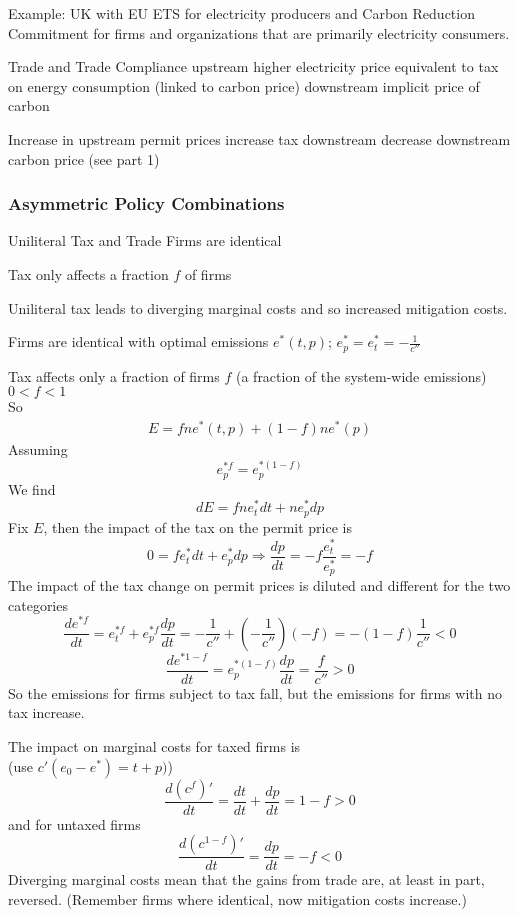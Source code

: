 	Example: UK with EU ETS for electricity producers and Carbon Reduction Commitment for firms and organizations that are primarily electricity consumers.


Trade and Trade
Compliance upstream
	higher electricity price
	equivalent to tax on energy consumption (linked to carbon price)
	downstream implicit price of carbon


Increase in upstream permit prices
	increase tax downstream
	decrease downstream carbon price (see part 1)


\subsubsection{Asymmetric Policy Combinations}

Uniliteral Tax and Trade
	Firms are identical
	
	Tax only affects a fraction $f$ of firms
	
	Uniliteral tax leads to diverging marginal costs and so increased mitigation costs.
	
	Firms are identical with optimal emissions $e^*(t,p)$; $e^*_p = e^*_t = -\frac{1}{c''}$
	
	Tax affects only a fraction of firms $f$ (a fraction of the system-wide emissions) $0 < f < 1$ \\
		 So
		\begin{align}
		E = fne^*(t,p)+(1-f)ne^*(p)
		\end{align}
	Assuming
		\[
		e^{*f}_p = e^{*(1-f)}_p
		\]
	We find
		\[
		dE = fne^*_tdt+ne^*_pdp
		\]
	Fix $E$, then the impact of the tax on the permit price is
		\[
		0 =  fe^*_tdt+e^*_pdp \Rightarrow \frac{dp}{dt} = -f \frac{e^*_t}{e^*_p} = -f
		\]
	The impact of the tax change on permit prices is diluted and different for the two categories
		\[
		\frac{de^{*f}}{dt} = e^{*f}_t + e^{*f}_p \frac{dp}{dt} = -\frac{1}{c''} + (-\frac{1}{c''})(-f) = -(1-f)\frac{1}{c''} < 0
		\]
		\[
		\frac{de^{*1-f}}{dt} = e^{*(1-f)}_p\frac{dp}{dt} = \frac{f}{c''} > 0
		\]
	So the emissions for firms subject to tax fall, but the emissions for firms with no tax increase.

	The impact on marginal costs for taxed firms is \\
	(use $c'(e_0-e^*) = t+p)$)
		\[
		\frac{d(c^f)'}{dt} = \frac{dt}{dt} + \frac{dp}{dt} = 1-f > 0
		\]
	and for untaxed firms
		\[
		\frac{d(c^{1-f})'}{dt} = \frac{dp}{dt} = -f < 0
		\]
	Diverging marginal costs mean that the gains from trade are, at least in part, reversed. (Remember firms where identical, now mitigation costs increase.)

